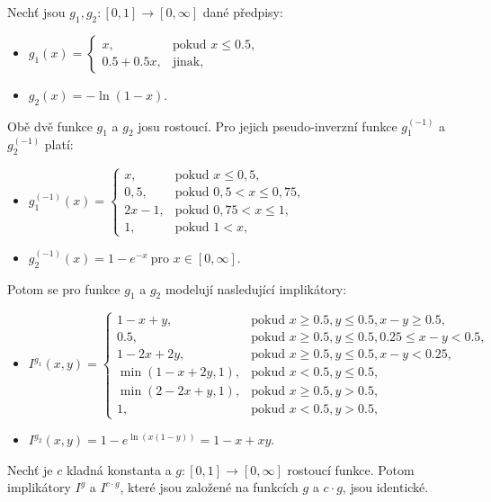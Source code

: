 \begin{example}
\cite{Springer}
    Nech\v t jsou $g_1, g_2:[0,1] \rightarrow [0,\infty]$ 
    dan\'e předpisy:
    \begin{itemize}
    \item $g_1(x)=\begin{cases}  x,    &\mbox{pokud $x \leq 0.5$}, \\
    0.5+0.5x,      &\text{jinak,} \end{cases}$
    \item $g_2(x)=-\ln(1-x).$
    \end{itemize}
    Obě dvě funkce $g_1$ a $g_2$ josu rostoucí.
    Pro jejich pseudo-inverzn\'i funkce  $g_1^{(-1)}$ a $g_2^{(-1)}$ plat\'i:
    \begin{itemize}
    \item $g_1^{(-1)}(x)=\begin{cases} x, &\mbox{pokud $x \leq 0,5$}, \\
    0,5,   &\mbox{pokud $0,5 < x \leq 0,75$}, \\
    2x-1,   &\mbox{pokud $0,75 < x \leq 1$}, \\
    1,   &\mbox{pokud $1 < x$}, \end{cases}$
    \item $g_2^{(-1)}(x)=1-e^{-x} ~ \mbox{pro $x \in [0, \infty]$}.$
    \end{itemize}
    Potom se pro funkce $g_1$ a $g_2$ modelují nasleduj\'icí implik\'atory:
    \begin{itemize}
    \item $I^{g_1}(x,y)=\begin{cases}  1-x+y,      &\mbox{pokud $x \geq 0.5, y \leq 0.5, x-y \geq 0.5$}, \\
    0.5,      &\mbox{pokud $x \geq 0.5, y \leq 0.5, 0.25 \leq x-y < 0.5$}, \\
    1-2x+2y,      &\mbox{pokud $x \geq 0.5, y \leq 0.5, x-y < 0.25$}, \\
    \min(1-x+2y,1),       &\mbox{pokud $x < 0.5, y \leq 0.5$}, \\
    \min(2-2x+y,1),       &\mbox{pokud $x \geq 0.5, y>0.5$}, \\
    1,       &\mbox{pokud $x < 0.5, y > 0.5,$} \end{cases}$
    \item $I^{g_2}(x,y)=1-e^{\ln(x(1-y))}=1-x+xy.$
    \end{itemize}
\end{example}

\begin{sentence} \cite{habilitace}
    Nech\v t je $c$ kladn\'a konstanta a $g:[0,1] \to [0,\infty]$
    rostoucí  funkce. Potom implik\'atory $I^g$ a $I^{c \cdot g}$,
    které jsou zalo\v zen\'e na  funkcích $g$ a $c \cdot g$, jsou
    identick\'e.
\end{sentence}



